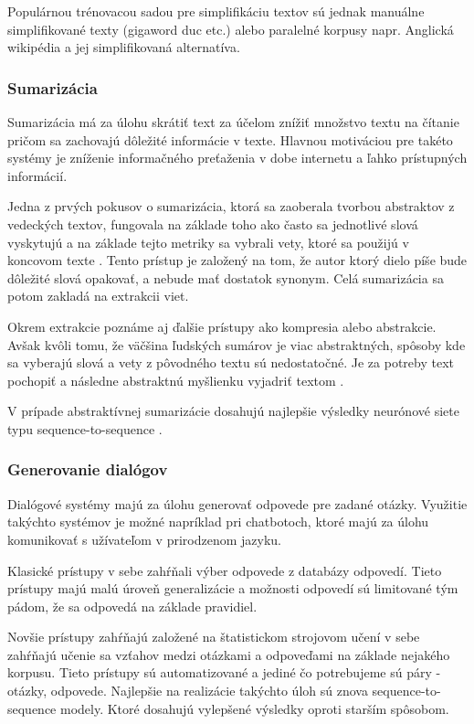     Populárnou trénovacou sadou pre simplifikáciu textov sú jednak manuálne simplifikované texty (gigaword duc etc.) alebo paralelné korpusy napr. Anglická wikipédia a jej simplifikovaná alternatíva\cite{Coster_2011_simpl_en_wiki}.

\subsubsection{Sumarizácia}
    Sumarizácia má za úlohu skrátiť text za účelom znížiť množstvo textu na čítanie pričom sa zachovajú dôležité informácie v texte. Hlavnou motiváciou pre takéto systémy je zníženie informačného preťaženia v dobe internetu a ľahko prístupných informácií\cite{nenkova_2011_autosum}.
    
    Jedna z prvých pokusov o sumarizácia, ktorá sa zaoberala tvorbou abstraktov z vedeckých textov, fungovala na základe toho ako často sa jednotlivé slová vyskytujú a na základe tejto metriky sa vybrali vety, ktoré sa použijú v koncovom texte \cite{luhn_1958_autoabstract}. Tento prístup je založený na tom, že autor ktorý dielo píše bude dôležité slová opakovať, a nebude mať dostatok synonym. Celá sumarizácia sa potom zakladá na extrakcii viet.
    
    Okrem extrakcie poznáme aj ďalšie prístupy ako kompresia alebo abstrakcie\cite{nenkova_2011_autosum}. Avšak kvôli tomu, že väčšina ľudských sumárov je viac abstraktných, spôsoby kde sa vyberajú slová a vety z pôvodného textu sú nedostatočné. Je za potreby text pochopiť a následne abstraktnú myšlienku vyjadriť textom \cite{Banko_2004_ngrams}.
    
    V prípade abstraktívnej sumarizácie dosahujú najlepšie výsledky neurónové siete typu sequence-to-sequence \cite{Piji_2017_deep_abs_sum}\cite{Nallapati_2016_sum_s2s}.

\subsubsection{Generovanie dialógov}
Dialógové systémy majú za úlohu generovať odpovede pre zadané otázky. Využitie takýchto systémov je možné napríklad pri chatbotoch, ktoré majú za úlohu komunikovať s užívateľom v prirodzenom jazyku.

Klasické prístupy v sebe zahŕňali výber odpovede z databázy odpovedí. Tieto prístupy majú malú úroveň generalizácie a možnosti odpovedí sú limitované tým pádom, že sa odpovedá na základe pravidiel\cite{AbuAli_2016_Botta}.

Novšie prístupy zahŕňajú založené na štatistickom strojovom učení v sebe zahŕňajú učenie sa vzťahov medzi otázkami a odpoveďami na základe nejakého korpusu. Tieto prístupy sú automatizované a jediné čo potrebujeme sú páry - otázky, odpovede. Najlepšie na realizácie takýchto úloh sú znova sequence-to-sequence modely. Ktoré dosahujú vylepšené výsledky oproti starším spôsobom\cite{Wu_2018_dialog}.

